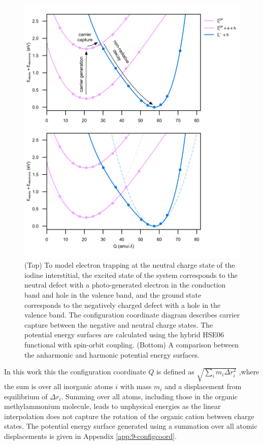 \begin{figure}[h!]   
\centering
  \includegraphics[width=1.0\columnwidth]{figures/ch6/carrier_capture_digram.png}
  \caption[Configuration coordinate diagram for carrier capture between $\mathrm{I}_\mathrm{i}^-$ and $\mathrm{I}_\mathrm{i}^0$]{(Top) To model electron trapping at the neutral charge state of the iodine interstitial, the excited state of the system corresponds to the neutral defect with a photo-generated electron in the conduction band and hole in the valence band, and the ground state corresponds to the negatively charged defect with a hole in the valence band. The configuration coordinate diagram describes carrier capture between the negative and neutral charge states. The potential energy surfaces are calculated using the hybrid HSE06 functional with spin-orbit coupling. (Bottom) A comparison between the anharmonic and harmonic potential energy surfaces.}
\label{configuration_coordinate}
\end{figure}


In this work this the configuration coordinate $Q$ is defined as $\sqrt{\sum_i m_i \Delta r_i^2}$ ,where the sum is over all inorganic atoms $i$ with mass $m_i$ and a displacement from equilibrium of $\Delta r_i$. Summing over all atoms, including those in the organic methylammonium molecule, leads to unphysical energies as the linear interpolation does not capture the rotation of the organic cation between charge states. The potential energy surface generated using a summation over all atomic displacements is given in Appendix \ref{app:9-configcoord}.

